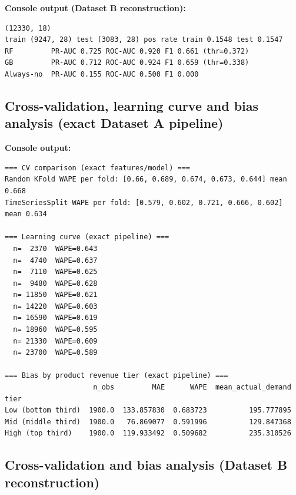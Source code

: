 

\textbf{Console output (Dataset B reconstruction):}
\begin{lstlisting}
(12330, 18)
train (9247, 28) test (3083, 28) pos rate train 0.1548 test 0.1547
RF         PR-AUC 0.725 ROC-AUC 0.920 F1 0.661 (thr=0.372)
GB         PR-AUC 0.712 ROC-AUC 0.924 F1 0.659 (thr=0.338)
Always-no  PR-AUC 0.155 ROC-AUC 0.500 F1 0.000
\end{lstlisting}

\subsection{Cross-validation, learning curve and bias analysis (exact Dataset A pipeline)}



\textbf{Console output:}
\begin{lstlisting}
=== CV comparison (exact features/model) ===
Random KFold WAPE per fold: [0.66, 0.689, 0.674, 0.673, 0.644] mean 0.668
TimeSeriesSplit WAPE per fold: [0.579, 0.602, 0.721, 0.666, 0.602] mean 0.634

=== Learning curve (exact pipeline) ===
  n=  2370  WAPE=0.643
  n=  4740  WAPE=0.637
  n=  7110  WAPE=0.625
  n=  9480  WAPE=0.628
  n= 11850  WAPE=0.621
  n= 14220  WAPE=0.603
  n= 16590  WAPE=0.619
  n= 18960  WAPE=0.595
  n= 21330  WAPE=0.609
  n= 23700  WAPE=0.589

=== Bias by product revenue tier (exact pipeline) ===
                     n_obs         MAE      WAPE  mean_actual_demand
tier
Low (bottom third)  1900.0  133.857830  0.683723          195.777895
Mid (middle third)  1900.0   76.869077  0.591996          129.847368
High (top third)    1900.0  119.933492  0.509682          235.310526
\end{lstlisting}

\subsection{Cross-validation and bias analysis (Dataset B reconstruction)}

